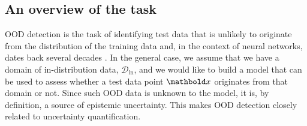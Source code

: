 \subsection{An overview of the task}
%
OOD detection is the task of identifying test data that is unlikely to originate from the distribution of the training data and, in the context of neural networks, dates back several decades \cite{bishop_novelty_1994, chang_figure_1993}.
In the general case, we assume that we have a domain of in-distribution data, $\mathcal{D}_{\text{in}}$, and we would like to build a model that can be used to assess whether a test data point $\xb$ originates from that domain or not. 
Since such OOD data is unknown to the model, it is, by definition, a source of epistemic uncertainty. This makes OOD detection closely related to uncertainty quantification. 


